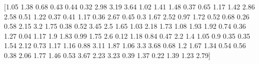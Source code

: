 \documentclass[preview]{standalone}
\begin{document}
\begin{center}
[1.05 1.38 0.68 0.43 0.44 0.32 2.98 3.19 3.64 1.02 1.41 1.48 0.37 0.65
 1.17 1.42 2.86 2.58 0.51 1.22 0.37 0.41 1.17 0.36 2.67 0.45 0.3  1.67
 2.52 0.97 1.72 0.52 0.68 0.26 0.58 2.15 3.2  1.75 0.38 0.52 3.45 2.5
 1.65 1.03 2.18 1.73 1.08 1.93 1.92 0.74 0.36 1.27 0.04 1.17 1.9  1.83
 0.99 1.75 2.6  0.12 1.18 0.84 0.47 2.2  1.4  1.05 0.9  0.35 0.35 1.54
 2.12 0.73 1.17 1.16 0.88 3.11 1.87 1.06 3.3  3.68 0.68 1.2  1.67 1.34
 0.54 0.56 0.38 2.06 1.77 1.46 0.53 3.67 2.23 3.23 0.39 1.37 0.22 1.39
 1.23 2.79]
\end{center}
\end{document}
